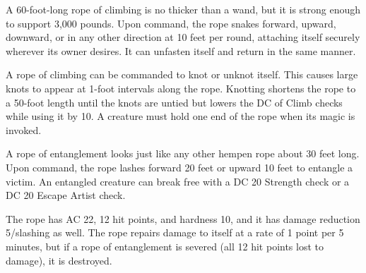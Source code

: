 {\begin{comment}
If a white robe is donned by an evil character, she immediately gains three negative levels. The reverse is true with respect to a black robe donned by a good character. An evil or good character who puts on a gray robe, or a neutral character who dons either a white or black robe, gains two negative levels. While these negative levels never result in lost levels, they remain as long as the garment is worn and cannot be overcome in any way (including restoration spells).

Strong varied; CL 14th; Craft Wondrous Item, antimagic field, mage armor or shield of faith, creator must be of same alignment as robe; Price 75,000 gp;Weight 1 lb.
\end{comment}

 A 60-foot-long rope of climbing is no thicker than a wand, but it is strong enough to support 3,000 pounds. Upon command, the rope snakes forward, upward, downward, or in any other direction at 10 feet per round, attaching itself securely wherever its owner desires. It can unfasten itself and return in the same manner.

A rope of climbing can be commanded to knot or unknot itself. This causes large knots to appear at 1-foot intervals along the rope. Knotting shortens the rope to a 50-foot length until the knots are untied but lowers the DC of Climb checks while using it by 10. A creature must hold one end of the rope when its magic is invoked.


 A rope of entanglement looks just like any other hempen rope about 30 feet long. Upon command, the rope lashes forward 20 feet or upward 10 feet to entangle a victim.  An entangled creature can break free with a DC 20 Strength check or a DC 20 Escape Artist check.

The rope has AC 22, 12 hit points, and hardness 10, and it has damage reduction 5/slashing as well. The rope repairs damage to itself at a rate of 1 point per 5 minutes, but if a rope of entanglement is severed (all 12 hit points lost to damage), it is destroyed.

}
